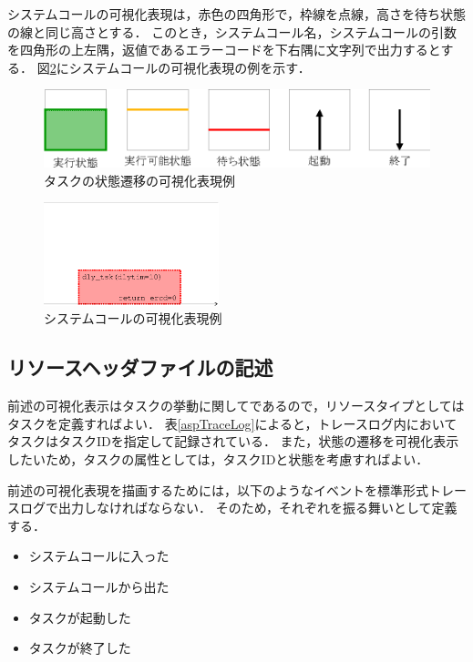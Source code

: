システムコールの可視化表現は，赤色の四角形で，枠線を点線，高さを待ち状態の線と同じ高さとする．
このとき，システムコール名，システムコールの引数を四角形の上左隅，返値であるエラーコードを下右隅に文字列で出力するとする．
図\ref{fig:svcCallVisual}にシステムコールの可視化表現の例を示す．

\begin{figure}[t]
\begin{center}
\includegraphics[scale=0.75]{img/taskStateChangeVisual.eps}
\caption{タスクの状態遷移の可視化表現例}
\label{fig:taskStateChangeVisual}
\end{center}
\end{figure}

\begin{figure}[t]
\begin{center}
\includegraphics[height=3cm]{img/svcCallVisual.eps}
\caption{システムコールの可視化表現例}
\label{fig:svcCallVisual}
\end{center}
\end{figure}

\subsection{リソースヘッダファイルの記述}

前述の可視化表示はタスクの挙動に関してであるので，リソースタイプとしてはタスクを定義すればよい．
表\ref{aspTraceLog}によると，トレースログ内においてタスクはタスクIDを指定して記録されている．
また，状態の遷移を可視化表示したいため，タスクの属性としては，タスクIDと状態を考慮すればよい．

前述の可視化表現を描画するためには，以下のようなイベントを標準形式トレースログで出力しなければならない．
そのため，それぞれを振る舞いとして定義する．

\begin{itemize}
\setlength{\itemsep}{-2mm}
\item システムコールに入った
\item システムコールから出た
\item タスクが起動した
\item タスクが終了した
\end{itemize}

